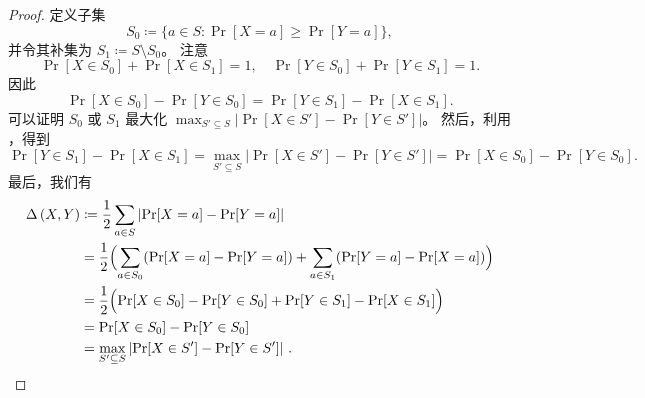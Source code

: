 \documentclass[american,singlepageview]{snargs-book-zh}
\renewcommand{\enspace}{\ensuremath{\thinspace}}
\newcommand{\DefineEqual}{\coloneqq}
\newcommand{\RandomVariableX}{X}
\newcommand{\RandomVariableY}{Y}
\newcommand{\RandomVariableSupport}{S}
\newcommand{\StatisticalDistanceSymbol}{\Delta}
\newcommand{\StatisticalDistance}[2]{\StatisticalDistanceSymbol\left(#1,#2\right)}
\newcommand{\AbsValue}[1]{\left|{#1}\right|}
\begin{document}
\begin{proof}
定义子集
\[
\RandomVariableSupport_{0}
\DefineEqual
\{ a \in \RandomVariableSupport : \Pr[\RandomVariableX=a] \geq \Pr[\RandomVariableY=a] \},
\]
并令其补集为
\(\RandomVariableSupport_{1} \DefineEqual \RandomVariableSupport \setminus \RandomVariableSupport_{0}\)。
注意
\[
\Pr[\RandomVariableX \in \RandomVariableSupport_{0}] + \Pr[\RandomVariableX \in \RandomVariableSupport_{1}] = 1,
\quad
\Pr[\RandomVariableY \in \RandomVariableSupport_{0}] + \Pr[\RandomVariableY \in \RandomVariableSupport_{1}] = 1.
\]
因此
\begin{equation}
\label{equation:statistical-distance-eq1}
\Pr[\RandomVariableX \in \RandomVariableSupport_{0}] - \Pr[\RandomVariableY \in \RandomVariableSupport_{0}]
=
\Pr[\RandomVariableY \in \RandomVariableSupport_{1}] - \Pr[\RandomVariableX \in \RandomVariableSupport_{1}].
\end{equation}
可以证明 $\RandomVariableSupport_{0}$ 或 $\RandomVariableSupport_{1}$ 最大化
\(\max_{\RandomVariableSupport' \subseteq \RandomVariableSupport} \AbsValue{\Pr[\RandomVariableX \in \RandomVariableSupport']-\Pr[\RandomVariableY \in \RandomVariableSupport']}\)。
然后，利用 ，得到
\[
\Pr[\RandomVariableY \in \RandomVariableSupport_{1}] - \Pr[\RandomVariableX \in \RandomVariableSupport_{1}]
=
\max_{\RandomVariableSupport' \subseteq \RandomVariableSupport} \AbsValue{\Pr[\RandomVariableX \in \RandomVariableSupport']-\Pr[\RandomVariableY \in \RandomVariableSupport']}
=
\Pr[\RandomVariableX \in \RandomVariableSupport_{0}]-\Pr[\RandomVariableY \in \RandomVariableSupport_{0}].
\]
最后，我们有
\begin{align*}
\StatisticalDistance{\RandomVariableX}{\RandomVariableY}
&\DefineEqual
\frac{1}{2} \sum_{a \in \RandomVariableSupport} \AbsValue{\Pr[\RandomVariableX=a]-\Pr[\RandomVariableY=a]}
\\ &=
\frac{1}{2} \Bigl(
\sum_{a \in \RandomVariableSupport_{0}} (\Pr[\RandomVariableX=a]-\Pr[\RandomVariableY=a])
+
\sum_{a \in \RandomVariableSupport_{1}} (\Pr[\RandomVariableY=a]-\Pr[\RandomVariableX=a])
\Bigr)
\\ &=
\frac{1}{2} \Bigl(
\Pr[\RandomVariableX \in \RandomVariableSupport_{0}]-\Pr[\RandomVariableY \in \RandomVariableSupport_{0}]
+
\Pr[\RandomVariableY \in \RandomVariableSupport_{1}]-\Pr[\RandomVariableX \in \RandomVariableSupport_{1}]
\Bigr)
\\ &=
\Pr[\RandomVariableX \in \RandomVariableSupport_{0}]-\Pr[\RandomVariableY \in \RandomVariableSupport_{0}]
\\ &=
\max_{\RandomVariableSupport' \subseteq \RandomVariableSupport} \AbsValue{\Pr[\RandomVariableX \in \RandomVariableSupport']-\Pr[\RandomVariableY \in \RandomVariableSupport']}
\enspace.
\end{align*}
\end{proof}
\end{document}
